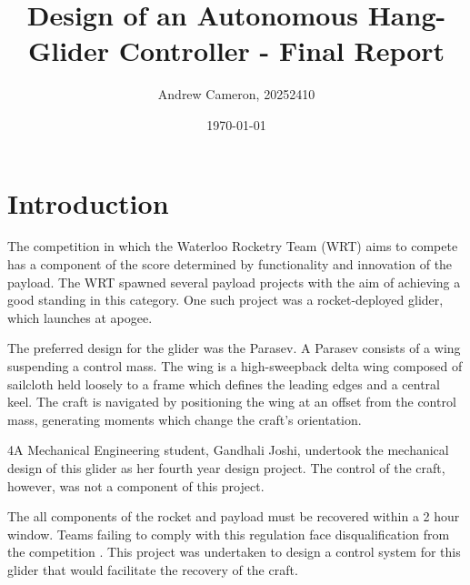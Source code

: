 \documentclass{sydeStyle}
\title{
Design of an Autonomous Hang-Glider Controller - Final Report
}
\date{\today}
\author{Andrew Cameron, 20252410}
\begin{document}
\maketitle

\tableofcontents

\chapter{Introduction}

The competition in which the Waterloo Rocketry Team (WRT) aims to compete has a
component of the score determined by functionality and innovation of the
payload\cite{IREC}. The WRT spawned several payload projects with the aim of
achieving a good standing in this category. One such project was a
rocket-deployed glider, which launches at apogee.

The preferred design for the glider was the Parasev. A Parasev consists of a
wing suspending a control mass\cite{wiki:parasev}. The wing is a high-sweepback
delta wing composed of sailcloth held loosely to a frame which defines the
leading edges and a central keel. The craft is navigated by positioning the wing
at an offset from the control mass, generating moments which change the craft's
orientation.

4A Mechanical Engineering student, Gandhali Joshi, undertook the mechanical
design of this glider as her fourth year design project. The control of the
craft, however, was not a component of this project.

The all components of the rocket and payload must be recovered within a 2 hour
window. Teams failing to comply with this regulation face disqualification from
the competition \cite{IREC}. This project was undertaken to design a control
system for this glider that would facilitate the recovery of the craft.
\end{document}
